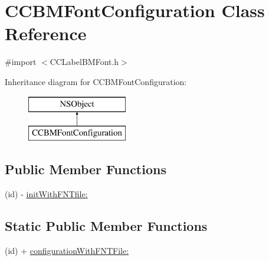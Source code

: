 \hypertarget{interface_c_c_b_m_font_configuration}{\section{C\-C\-B\-M\-Font\-Configuration Class Reference}
\label{interface_c_c_b_m_font_configuration}
}


{\ttfamily \#import $<$C\-C\-Label\-B\-M\-Font.\-h$>$}

Inheritance diagram for C\-C\-B\-M\-Font\-Configuration\-:\begin{figure}[H]
\begin{center}
\leavevmode
\includegraphics[height=2.000000cm]{interface_c_c_b_m_font_configuration}
\end{center}
\end{figure}
\subsection*{Public Member Functions}
\begin{DoxyCompactItemize}
\item 
(id) -\/ \hyperlink{interface_c_c_b_m_font_configuration_aba89ad3156aff35ff8e21c4d4f47be01}{init\-With\-F\-N\-Tfile\-:}
\end{DoxyCompactItemize}
\subsection*{Static Public Member Functions}
\begin{DoxyCompactItemize}
\item 
(id) + \hyperlink{interface_c_c_b_m_font_configuration_ad6edd555bbb3e20d9416cd627db7c4e0}{configuration\-With\-F\-N\-T\-File\-:}
\end{DoxyCompactItemize}
